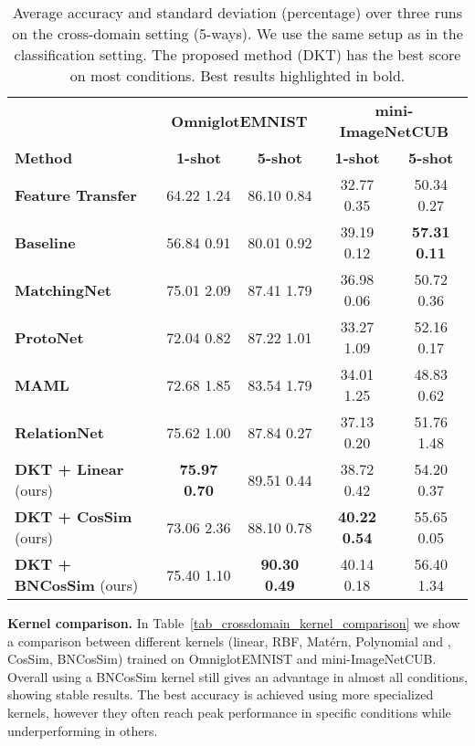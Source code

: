 \documentclass{article}
\begin{document}
\begin{table}[H]
\caption{Average accuracy and standard deviation (percentage) over three runs on the cross-domain setting (5-ways). We use the same setup as in the classification setting. The proposed method (DKT) has the best score on most conditions. Best results highlighted in bold.}
\centering
\begin{tabular}{lcccc}
\hline
\textbf{} & \multicolumn{2}{c}{\textbf{Omniglot}\textbf{EMNIST}} & \multicolumn{2}{c}{\textbf{mini-ImageNet}\textbf{CUB}} \\
\small{\textbf{Method}} & \textbf{1-shot}& \textbf{5-shot} & \textbf{1-shot} & \textbf{5-shot} \\ 
\hline
\small{\textbf{Feature Transfer}} & 64.22  \small{1.24} & 86.10  \small{0.84} & 32.77  \small{0.35} & 50.34  \small{0.27}\\
\small{\textbf{Baseline}} \citep{chen2019closerfewshot} & 56.84  \small{0.91} & 80.01  \small{0.92} & 39.19  \small{0.12} & \textbf{57.31  \small{0.11}}\\
\small{\textbf{MatchingNet}} \citep{vinyals2016matching}  & 75.01  \small{2.09} & 87.41  \small{1.79} & 36.98  \small{0.06} & 50.72  \small{0.36} \\
\small{\textbf{ProtoNet}} \citep{snell2017prototypical} & 72.04  \small{0.82} & 87.22  \small{1.01} & 33.27  \small{1.09} & 52.16  \small{0.17} \\
\small{\textbf{MAML}} \citep{finn2017model} & 72.68  \small{1.85} & 83.54  \small{1.79}  & 34.01  \small{1.25} &48.83  \small{0.62} \\
\small{\textbf{RelationNet}} \citep{sung2018learning} & 75.62  \small{1.00} & 87.84  \small{0.27}  & 37.13  \small{0.20} & 51.76  \small{1.48}\\
\hline
\small{\textbf{DKT + Linear}} (ours) & \textbf{75.97  \small{0.70}} & 89.51  \small{0.44} & 38.72  \small{0.42} & 54.20  \small{0.37}\\
\small{\textbf{DKT + CosSim}} (ours) & 73.06  \small{2.36} & 88.10  \small{0.78} & \textbf{40.22  \small{0.54}} & 55.65  \small{0.05} \\
\small{\textbf{DKT + BNCosSim}} (ours) & 75.40  \small{1.10} & \textbf{90.30  \small{0.49}} & 40.14  \small{0.18} & 56.40  \small{1.34} \\
\hline
\end{tabular}
\label{tab_crossdomain_accuracy}
\end{table}

\textbf{Kernel comparison.} In Table~\ref{tab_crossdomain_kernel_comparison} we show a comparison between different kernels (linear, RBF, Mat\'ern, Polynomial  and , CosSim, BNCosSim) trained on OmniglotEMNIST and mini-ImageNetCUB. Overall using a BNCosSim kernel still gives an advantage in almost all conditions, showing stable results. The best accuracy is achieved using more specialized kernels, however they often reach peak performance in specific conditions while underperforming in others.
\end{document}
